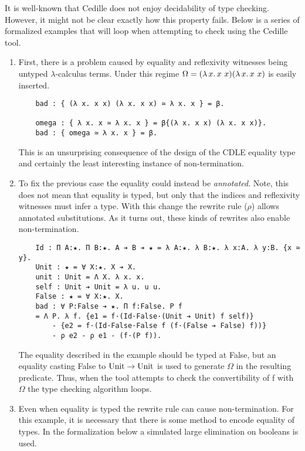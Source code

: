 It is well-known that Cedille does not enjoy decidability of type checking.
However, it might not be clear exactly how this property fails.
Below is a series of formalized examples that will loop when attempting to check using the Cedille tool.
\begin{enumerate}
    \item {
        First, there is a problem caused by equality and reflexivity witnesses being untyped $\lambda$-calculus terms.
        Under this regime $\Omega = ({\lambda}\, x.\, x\ x) ({\lambda}\, x.\, x\ x)$ is easily inserted.
\begin{verbatim}
    bad : { (λ x. x x) (λ x. x x) ≃ λ x. x } = β.

    omega : { λ x. x ≃ λ x. x } = β{(λ x. x x) (λ x. x x)}.
    bad : { omega ≃ λ x. x } = β.
\end{verbatim}
        This is an unsurprising consequence of the design of the CDLE equality type and certainly the least interesting instance of non-termination.
    }
    \item {
        To fix the previous case the equality could instead be \textit{annotated}.
        Note, this does not mean that equality is typed, but only that the indices and reflexivity witnesses must infer a type.
        With this change the rewrite rule ($\rho$) allows annotated substitutions.
        As it turns out, these kinds of rewrites also enable non-termination.
\begin{verbatim}
    Id : Π A:★. Π B:★. A ➔ B ➔ ★ = λ A:★. λ B:★. λ x:A. λ y:B. {x ≃ y}.
    Unit : ★ = ∀ X:★. X ➔ X.
    unit : Unit = Λ X. λ x. x.
    self : Unit ➔ Unit = λ u. u u.
    False : ★ = ∀ X:★. X.
    bad : ∀ P:False ➔ ★. Π f:False. P f
    = Λ P. λ f. {e1 = f·(Id·False·(Unit ➔ Unit) f self)}
        - {e2 = f·(Id·False·False f (f·(False ➔ False) f))}
        - ρ e2 - ρ e1 - (f·(P f)).
\end{verbatim}
        The equality described in the example should be typed at False, but an equality casting False to $\textnormal{Unit} \to \textnormal{Unit}$ is used to generate $\Omega$ in the resulting predicate.
        Thus, when the tool attempts to check the convertibility of f with $\Omega$ the type checking algorithm loops.
    }
    \item {
        Even when equality is typed the rewrite rule can cause non-termination.
        For this example, it is necessary that there is some method to encode equality of types.
        In the formalization below a simulated large elimination on booleans is used.
}
\end{enumerate}
